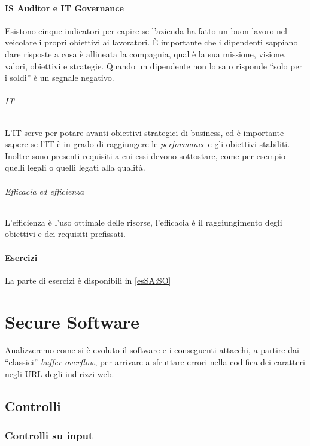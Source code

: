 \subsection{IS Auditor e IT Governance}

Esistono cinque indicatori per capire se l'azienda ha fatto un buon lavoro nel 
veicolare i propri obiettivi ai lavoratori. È importante che i dipendenti 
sappiano dare risposte a cosa è allineata la compagnia, qual è la sua missione, 
visione, valori, obiettivi e strategie. Quando un dipendente non lo sa o 
risponde ``solo per i soldi'' è un segnale negativo.

\paragraph*{IT} L'IT serve per potare avanti obiettivi strategici di business, 
ed è importante sapere se l'IT è in grado di raggiungere le \textit{performance} 
e gli obiettivi stabiliti. Inoltre sono presenti requisiti a cui essi devono 
sottostare, come per esempio quelli legali o quelli legati alla qualità.

\paragraph*{Efficacia ed efficienza} L'efficienza è l'uso ottimale delle 
risorse, l'efficacia è il raggiungimento degli obiettivi e dei requisiti 
prefissati.


\subsection{Esercizi}

La parte di esercizi è disponibili in \ref{esSA:SO}

\part{Secure Software}

Analizzeremo come si è evoluto il software e i conseguenti attacchi, a partire 
dai ``classici'' \textit{buffer overflow}, per arrivare a sfruttare errori nella 
codifica dei caratteri negli URL degli indirizzi web.

\chapter{Controlli}
\label{Controlli}

\section{Controlli su input}

